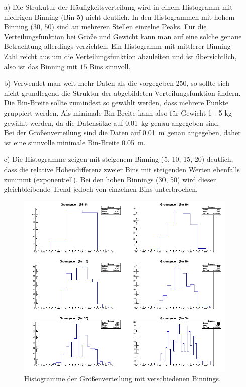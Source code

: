 \begin{itemize} 
\item[a)] Die Strukutur der Häufigkeitsverteilung wird in einem Histogramm mit niedrigen 
Binning (Bin 5) nicht deutlich. 
In den Histogrammen mit hohem Binning ($30$, $50$) sind an mehreren Stellen einzelne Peaks.
Für die Verteilungsfunktion bei Größe und Gewicht kann man auf eine solche
genaue Betrachtung allerdings verzichten.
Ein Histogramm mit mittlerer Binning Zahl reicht aus um die Verteilungsfunktion abzuleiten und ist übersichtlich, also ist das Binning mit $15$ Bins sinnvoll.

\item[b)] Verwendet man weit mehr Daten als die vorgegeben 250, so sollte sich nicht grundlegend die
Struktur der abgebildeten Verteilungsfunktion ändern.
Die Bin-Breite sollte zumindest so gewählt werden, dass mehrere Punkte gruppiert werden. Als minimale Bin-Breite kann also für Gewicht 1 - 5 kg gewählt werden, da die Datensätze auf \SI{0.01}{\kilogram} genau angegeben sind.\\
Bei der Größenverteilung sind die Daten
auf \SI{0.01}{\metre} genau angegeben, daher ist eine sinnvolle minimale Bin-Breite \SI{0.05}{\metre}. 

\item[c)]
Die Histogramme zeigen mit steigenem Binning (5, 10, 15, 20) deutlich,
dass die relative Höhendifferenz zweier Bins mit steigenden Werten ebenfalls zunimmt (exponentiell).
Bei den hohen Binnings (30, 50) wird dieser gleichbleibende Trend jedoch von einzelnen Bins unterbrochen.

\begin{figure}
\centering
\includegraphics[width=\textwidth]{GroessenverteilungBinnings2x3.png}
\caption{Histogramme der Größenverteilung mit verschiedenen Binnings.}
\end{figure}


\end{itemize}
